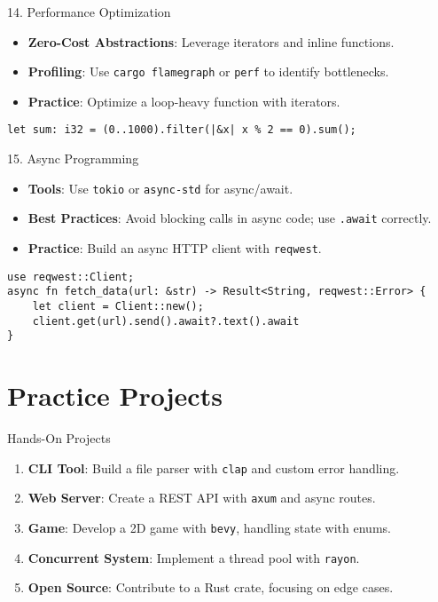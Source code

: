 \documentclass[10pt]{beamer}
\begin{document}
\begin{frame}{14. Performance Optimization}
    \begin{itemize}
        \item \textbf{Zero-Cost Abstractions}: Leverage iterators and inline functions.
        \item \textbf{Profiling}: Use \texttt{cargo flamegraph} or \texttt{perf} to identify bottlenecks.
        \item \textbf{Practice}: Optimize a loop-heavy function with iterators.
    \end{itemize}
    \begin{lstlisting}
let sum: i32 = (0..1000).filter(|&x| x % 2 == 0).sum();
    \end{lstlisting}
\end{frame}

\begin{frame}{15. Async Programming}
    \begin{itemize}
        \item \textbf{Tools}: Use \texttt{tokio} or \texttt{async-std} for async/await.
        \item \textbf{Best Practices}: Avoid blocking calls in async code; use \texttt{.await} correctly.
        \item \textbf{Practice}: Build an async HTTP client with \texttt{reqwest}.
    \end{itemize}
    \begin{lstlisting}
use reqwest::Client;
async fn fetch_data(url: &str) -> Result<String, reqwest::Error> {
    let client = Client::new();
    client.get(url).send().await?.text().await
}
    \end{lstlisting}
\end{frame}

\section{Practice Projects}
\begin{frame}{Hands-On Projects}
    \begin{enumerate}
        \item \textbf{CLI Tool}: Build a file parser with \texttt{clap} and custom error handling.
        \item \textbf{Web Server}: Create a REST API with \texttt{axum} and async routes.
        \item \textbf{Game}: Develop a 2D game with \texttt{bevy}, handling state with enums.
        \item \textbf{Concurrent System}: Implement a thread pool with \texttt{rayon}.
        \item \textbf{Open Source}: Contribute to a Rust crate, focusing on edge cases.
    \end{enumerate}
\end{frame}
\end{document}
